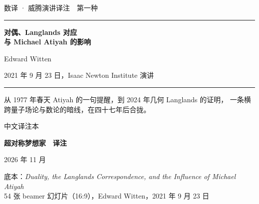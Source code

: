 \begin{titlepage}
\thispagestyle{empty}
\centering
\vspace*{0.8cm}

{\small\color{shuyiGray}数译 · 威腾演讲译注　第一种}

\vspace{2.0cm}
{\color{shuyiBlue}\rule{0.74\textwidth}{0.9pt}}

\vspace{1.0cm}
{\Huge\bfseries 对偶、Langlands 对应\\[0.42em]与 Michael Atiyah 的影响\par}

\vspace{1.0cm}
{\Large Edward Witten\par}
\vspace{0.5cm}
{\normalsize\color{shuyiGray}2021 年 9 月 23 日，Isaac Newton Institute 演讲\par}

\vspace{0.7cm}
{\color{shuyiBlue}\rule{0.74\textwidth}{0.9pt}}

\vfill

\begin{minipage}{0.76\textwidth}
\centering\small\color{shuyiGray}
从 1977 年春天 Atiyah 的一句提醒，到 2024 年几何 Langlands 的证明，
一条横跨量子场论与数论的暗线，在四十七年后合拢。
\end{minipage}

\vfill

{\large 中文译注本\par}
\vspace{0.45cm}
{\large\bfseries 超对称梦想家　译注\par}

\vspace{2.2cm}
{\small 2026 年 11 月\par}

\vspace{0.6cm}
{\scriptsize\color{shuyiGray}
底本：\emph{Duality, the Langlands Correspondence, and the Influence of Michael Atiyah}\\
54 张 beamer 幻灯片（16:9），Edward Witten，2021 年 9 月 23 日\par}

\end{titlepage}
